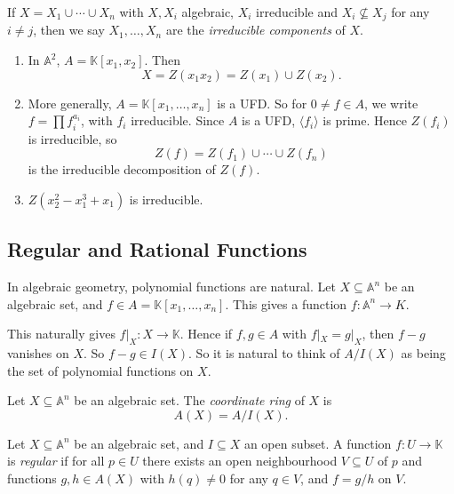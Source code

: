 \documentclass[12pt]{article}
\begin{document}
\begin{definition}
	If $X = X_1 \cup \cdots \cup X_n$ with $X, X_i$ algebraic, $X_i$ irreducible and $X_i \not \subseteq X_j$ for any $i \neq j$, then we say $X_1, \ldots, X_n$ are the \emph{irreducible components} of $X$.
\end{definition}

\begin{exbox}
	\begin{enumerate}
		\item In $\mathbb{A}^2$, $A = \mathbb{K}[x_1, x_2]$. Then
			\[
			X = Z(x_1 x_2) = Z(x_1) \cup Z(x_2).
			\]
		\item More generally, $A = \mathbb{K}[x_1, \ldots, x_n]$ is a UFD. So for $0 \neq f \in A$, we write $f = \prod f_i^{a_i}$, with $f_i$ irreducible. Since $A$ is a UFD, $\langle f_i \rangle$ is prime. Hence $Z(f_i)$ is irreducible, so
			\[
			Z(f) = Z(f_1) \cup \cdots \cup Z(f_n)
			\]
			is the irreducible decomposition of $Z(f)$.
		\item $Z(x_2^2 - x_1^3 + x_1)$ is irreducible.
	\end{enumerate}
\end{exbox}

\subsection{Regular and Rational Functions}
\label{sub:reg_rat_fs}

In algebraic geometry, polynomial functions are natural. Let $X \subseteq \mathbb{A}^n$ be an algebraic set, and $f \in A = \mathbb{K}[x_1, \ldots, x_n]$. This gives a function $f : \mathbb{A}^n \to K$.

This naturally gives $f|_X : X \to \mathbb{K}$. Hence if $f, g \in A$ with $f|_X = g|_X$, then $f - g$ vanishes on $X$. So $f - g \in I(X)$. So it is natural to think of $A/I(X)$ as being the set of polynomial functions on $X$.

\begin{definition}
	Let $X \subseteq \mathbb{A}^n$ be an algebraic set. The \emph{coordinate ring} of $X$ is
	\[
	A(X) = A/I(X).
	\]
\end{definition}

\begin{definition}
	Let $X \subseteq \mathbb{A}^n$ be an algebraic set, and $I \subseteq X$ an open subset. A function $f : U \to \mathbb{K}$ is \emph{regular} if for all $p \in U$ there exists an open neighbourhood $V \subseteq U$ of $p$ and functions $g, h \in A(X)$ with $h(q) \neq 0$ for any $q \in V$, and $f = g/h$ on $V$.
\end{definition}
\end{document}
